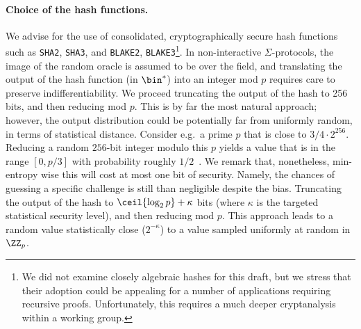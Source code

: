\documentclass[runningheads,11pt]{article}
\begin{document}
\paragraph{Choice of the hash functions.} We advise for the use of consolidated, cryptographically secure hash functions such as \verb|SHA2|, \verb|SHA3|, and \verb|BLAKE2|, \verb|BLAKE3|\footnote{We did not examine closely algebraic hashes for this draft, but we stress that their adoption could be appealing for a number of applications requiring recursive proofs. Unfortunately, this requires a much deeper cryptanalysis within a working group.}.
In non-interactive $\Sigma$-protocols, the image of the random oracle is assumed to be over the field, and translating the output of the hash function (in $\bin^*$) into an integer mod $p$ requires care to preserve indifferentiability.
We proceed truncating the output of the hash to 256 bits, and then reducing mod $p$.
 This is by far the most natural approach; however, the output distribution could be potentially far from uniformly random, in terms of statistical distance.
Consider e.g.\ a prime $p$ that is close to $3/4 \cdot 2^{256}$. Reducing a random $256$-bit integer modulo this $p$ yields a value that is in the range $[0, p / 3]$ with probability roughly $1/2$~\cite{hash-to-curve}.
 We remark that, nonetheless, min-entropy wise this will cost at most one bit of security.
 Namely, the chances of guessing a specific challenge is still than negligible despite the bias.
  Truncating the output of the hash to $\ceil{\log_2 p} + \kappa$ bits (where $\kappa$ is the targeted statistical
 security level), and then reducing mod $p$.
 This approach leads to a random value statistically close ($2^{-\kappa}$) to a value sampled uniformly at random in $\ZZ_p$.
\end{document}
